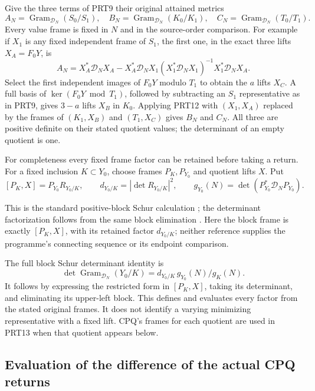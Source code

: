 \documentclass[11pt,a4paper]{article}
\begin{document}
Give the three terms of PRT9 their original attained metrics
\[
 A_N=\operatorname{Gram}_{\mathcal D_N}(S_0/S_1),\quad
 B_N=\operatorname{Gram}_{\mathcal D_N}(K_0/K_1),\quad
 C_N=\operatorname{Gram}_{\mathcal D_N}(T_0/T_1).
 \tag{PRT11}
\]
Every value frame is fixed in $N$ and in the source-order comparison.
For example if $X_1$ is any fixed independent frame of $S_1$, the first
one, in the exact three lifts $X_A=F_0Y$, is
\[
 A_N=X_A^*\mathcal D_NX_A-X_A^*\mathcal D_NX_1
 (X_1^*\mathcal D_NX_1)^{-1}X_1^*\mathcal D_NX_A.
 \tag{PRT12}
\]
Select the first independent images of $F_0Y$ modulo $T_1$ to obtain
the $a$ lifts $X_C$. A full basis of $\ker(F_0Y\bmod T_1)$, followed
by subtracting an $S_1$ representative as in PRT9, gives $3-a$
lifts $X_B$ in $K_0$. Applying PRT12 with $(X_1,X_A)$ replaced by
the frames of $(K_1,X_B)$ and $(T_1,X_C)$ gives $B_N$ and $C_N$.
All three are positive definite on their stated quotient values;
the determinant of an empty quotient is one.

For completeness every fixed frame factor can be retained before
taking a return. For a fixed inclusion $K\subset Y_0$, choose frames
$P_K,P_{Y_0}$ and quotient lifts $X$. Put
\[
 [P_K,X]=P_{Y_0}R_{Y_0/K},\qquad
 d_{Y_0/K}=|\det R_{Y_0/K}|^2,\qquad
 g_{Y_0}(N)=\det(P_{Y_0}^*\mathcal D_NP_{Y_0}).
 \tag{PRT13}
\]


This is the standard positive-block Schur calculation
\cite[\S2.1, (2.3)--(2.4)]{human:boyd1994}; the determinant
factorization follows from the same block elimination
\cite[p.~222, (6a)--(6b)]{human:hager1989}.
Here the block frame is exactly $[P_K,X]$, with its retained
factor $d_{Y_0/K}$; neither reference supplies the programme's
connecting sequence or its endpoint comparison.

The full block Schur determinant identity is
\[
 \det\operatorname{Gram}_{\mathcal D_N}(Y_0/K)
       =d_{Y_0/K}\,g_{Y_0}(N)/g_K(N).
 \tag{PRT14}
\]
It follows by expressing the restricted form in $[P_K,X]$,
taking its determinant, and eliminating its upper-left block.
This defines and evaluates every factor from the stated original
frames. It does not identify a varying minimizing representative
with a fixed lift. CPQ's frames for each quotient are used in
PRT13 when that quotient appears below.

\subsection{Evaluation of the difference of the actual CPQ returns}
\end{document}
